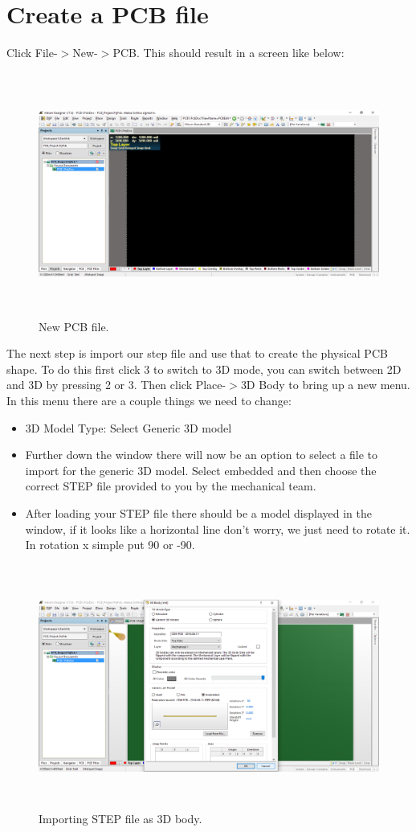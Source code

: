 \documentclass{report}
\begin{document}
	\section{Create a PCB file}
	Click File-$>$New-$>$PCB. This should result in a screen like below:
	
	\begin{figure}[H]	
		\centering
		\includegraphics[width=16cm, height=8cm]{pics/new_pcb_file.png}
		\caption{New PCB file.}
		\label{fig 1}
	\end{figure}
	The next step is import our step file and use that to create the physical PCB shape. To do this first click 3 to switch to 3D mode, you can switch between 2D and 3D by pressing 2 or 3. Then click Place-$>$3D Body to bring up a new menu. In this menu there are a couple things we need to change:
	\begin{itemize}
		\item 3D Model Type: Select Generic 3D model
		\item Further down the window there will now be an option to select a file to import for the generic 3D model. Select embedded and then choose the correct STEP file provided to you by the mechanical team.
		\item After loading your STEP file there should be a model displayed in the window, if it looks like a horizontal line don't worry, we just need to rotate it. In rotation x simple put 90 or -90.
	\end{itemize}
	\begin{figure}[H]	
		\centering
		\includegraphics[width=16cm, height=8cm]{pics/import_step.png}
		\caption{Importing STEP file as 3D body.}
		\label{fig 2}
	\end{figure}
\end{document}
